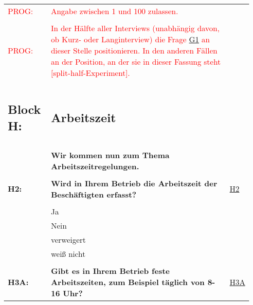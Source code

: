 \begin{longtable}{!{\color{black}\vline width 1pt}  L{2cm}!{\color{black}\vline width 1pt} L{12.25cm}!{\color{black}\vline width 1pt}  L{2.5cm}!{\color{black}\vline width 1pt}}
  \textcolor{red}{PROG:} & \textcolor{red}{Angabe zwischen 1 und 100 zulassen.} &  \\ 
   &  &  \\ 
  \textcolor{red}{PROG:} & \textcolor{red}{In der Hälfte aller Interviews (unabhängig davon, ob Kurz- oder Langinterview) die Frage  \hyperref[G1]{G1} an dieser Stelle positionieren. In den anderen Fällen an der Position, an der sie in dieser Fassung steht [split-half-Experiment\label{splithalf}].} &  \\ 
   &  &  \\ 
   \midrule
{}\protect\subsection[\parbox{\mylength}{Block H:} Arbeitszeit]{Block H:} & \protect\subsection*{Arbeitszeit} &  \\ 
   &  &  \\ 
   & \textbf{Wir kommen nun zum Thema Arbeitszeitregelungen.} &  \\ 
   &  &  \\ 
   \midrule
{}\textbf{H2:}\label{H2} & \textbf{Wird in Ihrem Betrieb die Arbeitszeit der Beschäftigten erfasst?} & \hyperref[var:H2]{H2} \\ 
   &  &  \\ 
   & Ja &  \\ 
   & Nein &  \\ 
   & verweigert &  \\ 
   & weiß nicht &  \\ 
   &  &  \\ 
   \midrule
{}\textbf{H3A:}\label{H3A} & \textbf{Gibt es in Ihrem Betrieb feste Arbeitszeiten, zum Beispiel täglich von 8-16 Uhr?} & \hyperref[var:H3A]{H3A} \\ 

\end{longtable}
